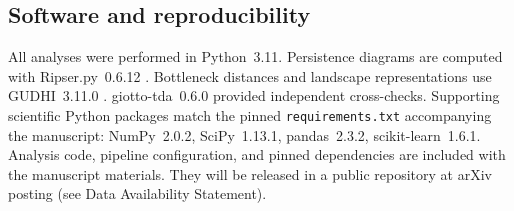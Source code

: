 \subsection{Software and reproducibility}

All analyses were performed in Python~3.11. Persistence diagrams are
computed with Ripser.py~0.6.12 \citep{bauer2021ripser,tralie2018}.
Bottleneck distances and landscape representations use
GUDHI~3.11.0 \citep{gudhi2014}. giotto-tda~0.6.0 \citep{tauzin2021}
provided independent cross-checks. Supporting scientific Python packages
match the pinned \texttt{requirements.txt} accompanying the manuscript:
NumPy~2.0.2, SciPy~1.13.1, pandas~2.3.2, scikit-learn~1.6.1. Analysis
code, pipeline configuration, and pinned dependencies are included with
the manuscript materials. They will be released in a public repository
at arXiv posting (see Data Availability Statement).
